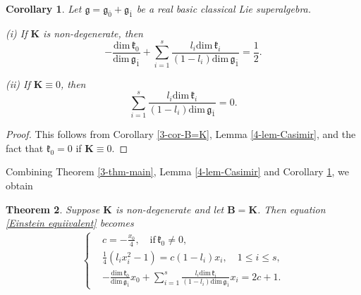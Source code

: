 \documentclass[reqno]{amsart}
\newtheorem{thm}{Theorem}[section]
\newtheorem{cor}[thm]{Corollary}
\theoremstyle{definition}
\begin{document}
\begin{cor}\label{4-cor-K-B}
 Let $\mathfrak{g}=\mathfrak{g}_{\bar{0}}+\mathfrak{g}_{\bar{1}}$ be a real basic classical Lie superalgebra.

 (i) If $\mathbf{K}$ is non-degenerate, then
$$-\frac{\mathrm{dim}\,\mathfrak{k}_{0}}{\mathrm{dim}\,\mathfrak{g}_{\bar{1}}}
  +\sum_{i=1}^{s}\frac{l_{i}\mathrm{dim}\,\mathfrak{k}_{i}}{(1-l_{i})\mathrm{dim}\,\mathfrak{g}_{\bar{1}}}
  =\frac{1}{2}.$$

 (ii) If $\mathbf{K}\equiv0$, then
 $$ \sum_{i=1}^{s}\frac{l_{i}\mathrm{dim}\,\mathfrak{k}_{i}}{(1-l_{i})\mathrm{dim}\,\mathfrak{g}_{\bar{1}}}
  =0.$$
\end{cor}
\begin{proof}
 This follows from Corollary \ref{3-cor-B=K}, Lemma \ref{4-lem-Casimir}, and the fact that $\mathfrak{k}_{0}=0$ if $\mathbf{K}\equiv0$.
\end{proof}
Combining Theorem \ref{3-thm-main}, Lemma \ref{4-lem-Casimir} and Corollary \ref{4-cor-K-B}, we obtain
\begin{thm}\label{4-thm-B=K}
 Suppose $\mathbf{K}$ is non-degenerate and let $\mathbf{B}=\mathbf{K}$.
  Then  equation \eqref{Einstein equiivalent} becomes
\begin{eqnarray}\label{B=K equivalent}
\left\{
\begin{aligned}
&c=-\frac{x_{0}}{4},\quad \mathrm{if}\, \mathfrak{k}_{0}\neq0, \\
&\frac{1}{4}(l_{i}x_{i}^{2}-1)=c (1-l_{i})x_{i},\quad 1\leq i\leq s,\\
&-\frac{\mathrm{dim}\,\mathfrak{k}_{0}}{\mathrm{dim}\,\mathfrak{g}_{\bar{1}}}x_{0}
+\sum\limits_{i=1}^{s}\frac{l_{i}\mathrm{dim}\,\mathfrak{k}_{i}}{(1-l_{i})\mathrm{dim}\,\mathfrak{g}_{\bar{1}}}x_{i}=2c+1.
\end{aligned}\right.
\end{eqnarray}
\end{thm}
\end{document}
